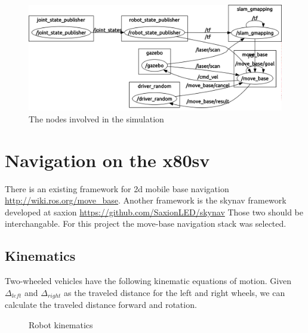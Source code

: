 \documentclass[a4paper]{article}
\begin{document}
\begin{figure}[h!]
  \centering
  \includegraphics[width=\textwidth,height=\textheight,keepaspectratio]{img/simulatie_nodes.png}
  \caption{The nodes involved in the simulation}
\end{figure}


\section{Navigation on the x80sv}

There is an existing framework for 2d mobile base navigation \url{http://wiki.ros.org/move_base}.
Another framework is the skynav framework developed at saxion \url{https://github.com/SaxionLED/skynav}
Those two should be interchangable. For this project the move-base navigation
stack was selected.

\subsection{Kinematics}

Two-wheeled vehicles have the following kinematic equations of motion.
Given $\Delta_{left}$ and $\Delta_{right}$ as the traveled distance for the left and
right wheels, we can calculate the traveled distance forward and rotation.

\begin{figure}[h!]
 \centering
 \caption{Robot kinematics}
\end{figure}
\end{document}
